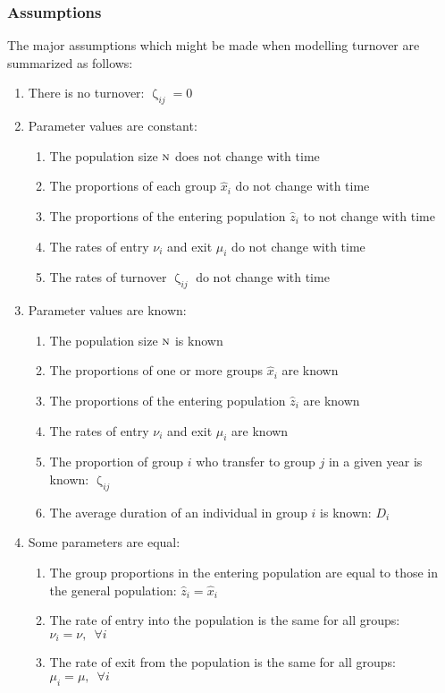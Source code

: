 \documentclass{article}
\numberwithin{equation}{section}
\renewcommand{\zeta}{\upzeta}
\newcommand{\x}{\hat{x}}
\newcommand{\z}{\hat{z}}
\newcommand{\N}{\textsc{n}}
\begin{document}
\subsubsection{Assumptions}
The major assumptions which might be made when modelling turnover are summarized as follows:
\begin{enumerate} %
  \item \label{ass:zeta=0} There is no turnover: $\zeta_{ij} = 0$
  \item \label{ass:const} Parameter values are constant:
  \begin{enumerate}
    \item \label{ass:const-N} The population size $\N$ does not change with time
    \item \label{ass:const-x} The proportions of each group $\x_i$ do not change with time
    \item \label{ass:const-z} The proportions of the entering population $\z_i$ to not change with time
    \item \label{ass:const-nu-mu} The rates of entry $\nu_i$ and exit $\mu_i$ do not change with time
    \item \label{ass:const-zeta} The rates of turnover $\zeta_{ij}$ do not change with time
  \end{enumerate}
  \item \label{ass:know} Parameter values are known:
  \begin{enumerate}
    \item \label{ass:know-N} The population size $\N$ is known
    \item \label{ass:know-x} The proportions of one or more groups $\x_i$ are known
    \item \label{ass:know-z} The proportions of the entering population $\z_i$ are known
    \item \label{ass:know-nu-mu} The rates of entry $\nu_i$ and exit $\mu_i$ are known
    \item \label{ass:know-zeta-i} The proportion of group $i$ who transfer to group $j$ in a given year is known: $\zeta_{ij}$
    \item \label{ass:know-dur-i} The average duration of an individual in group $i$ is known: $D_i$
  \end{enumerate}
  \item \label{ass:equal} Some parameters are equal:
  \begin{enumerate}
    \item \label{ass:z=x} The group proportions in the entering population are equal to those in the general population: $\z_i = \x_i$
    \item \label{ass:one-nu} The rate of entry into the population is the same for all groups: $\nu_i = \nu, \enspace\forall i$
    \item \label{ass:one-mu} The rate of exit from the population is the same for all groups: $\mu_i = \mu, \enspace\forall i$
  \end{enumerate}
\end{enumerate}
\end{document}
